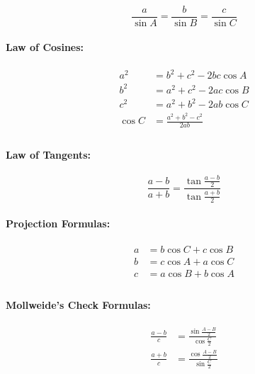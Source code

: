 \documentclass[
]{book}
\begin{document}
\[\frac{a}{\sin{A}} = \frac{b}{\sin{B}} = \frac{c}{\sin{C}}\]

\hypertarget{law-of-cosines}{%
\paragraph*{Law of Cosines:}\label{law-of-cosines}}

\begin{align}
a^2  &= b^2  + c^2  - 2bc\cos{A}\\
b^2  &= a^2  + c^2  - 2ac\cos{B}\\
c^2  &= a^2  + b^2  - 2ab\cos{C}\\
\cos{C} &= \frac{a^2 +b^2 -c^2}{2ab}\\
\end{align}

\hypertarget{law-of-tangents}{%
\paragraph*{Law of Tangents:}\label{law-of-tangents}}

\[\frac{a-b}{a+b} = \frac{\tan\frac{a-b}{2}}{\tan\frac{a+b}{2}}\]

\hypertarget{projection-formulas}{%
\paragraph*{Projection Formulas:}\label{projection-formulas}}

\begin{align}
a &= b\cos{C} + c\cos{B}\\
b &= c\cos{A} + a\cos{C}\\
c &= a\cos{B} + b\cos{A}\\
\end{align}

\hypertarget{mollweides-check-formulas}{%
\paragraph*{Mollweide's Check Formulas:}\label{mollweides-check-formulas}}

\begin{align}
\frac{a-b}{c} &= \frac{\sin\frac{A-B}{2}}{\cos\frac{C}{2}}\\
\frac{a+b}{c} &= \frac{\cos\frac{A-B}{2}}{\sin\frac{C}{2}}\\
\end{align}
\end{document}
